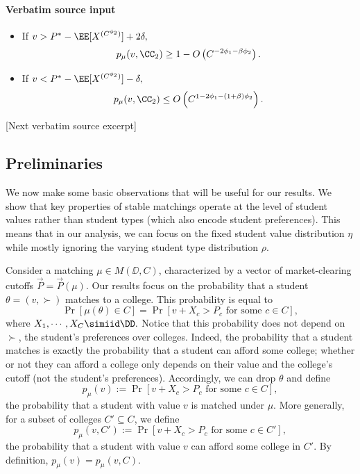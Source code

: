\documentclass[10pt]{article}
\begin{document}
\paragraph{Verbatim source input}
\begin{ReviewVerbatim}
\begin{proposition}\label{prop:tomato}
\quad
    \begin{itemize}
        \item[(i)] If $v > P^* - \EE[X^{(C^{\phi_2})}]  + 2\delta,$
        \begin{equation}
            p_\mu(v, \CC_2) \ge 1 - O\left(C^{-2\phi_1 - \beta\phi_2}\right).
        \end{equation}
        \item[(ii)] If $v < P^* - \EE[X^{(C^{\phi_2})}]  - \delta,$
        \begin{equation}
            p_\mu(v, \CC_2) \le O\left(C^{1-2\phi_1 - (1 + \beta)\phi_2}\right).
        \end{equation}
    \end{itemize}
\end{proposition}

[Next verbatim source excerpt]

\subsection{Preliminaries}
We now make some basic observations that will be useful for our results. We show that key properties of stable matchings operate at the level of student values rather than student types (which also encode student preferences). This means that in our analysis, we can focus on the fixed student value distribution $\eta$ while mostly ignoring the varying student type distribution $\rho$.

Consider a matching $\mu\in M(\DD, C)$, characterized by a vector of market-clearing cutoffs $\vec{P}=\vec{P}(\mu)$. Our results focus on the probability that a student $\theta=(v,\succ)$ matches to a college. This probability is equal to
\begin{equation}
    \Pr[\mu(\theta)\in C] = \Pr[v + X_c > P_c\text{ for some $c\in C$}],
\end{equation}
where $X_1, \cdots, X_C \simiid \DD.$ Notice that this probability does not depend on $\succ$, the student's preferences over colleges. Indeed, the probability that a student matches is exactly the probability that a student can afford some college; whether or not they can afford a college only depends on their value and the college's cutoff (not the student's preferences). Accordingly, we can drop $\theta$ and define
\begin{equation}
    p_\mu(v) := \Pr[v + X_c > P_c\text{ for some $c\in C$}],
\end{equation}
the probability that a student with value $v$ is matched under $\mu$. More generally, for a subset of colleges $C'\subseteq C$, we define
\begin{equation}
    p_\mu(v, C') := \Pr[v + X_c > P_c\text{ for some $c\in C'$}],
\end{equation}
the probability that a student with value $v$ can afford some college in $C'$. By definition, $p_\mu(v) = p_\mu(v, C).$


\end{ReviewVerbatim}
\end{document}
